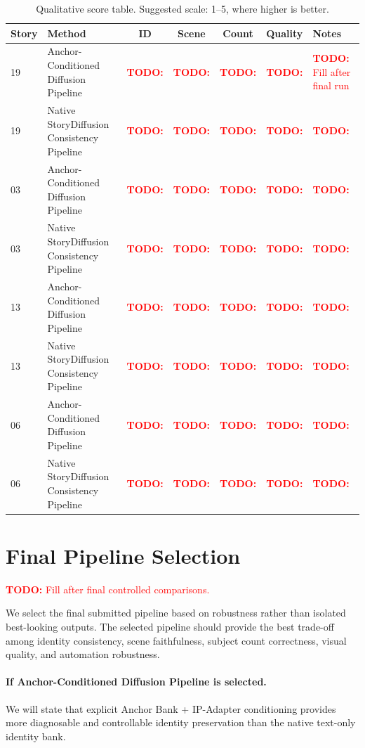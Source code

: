 \documentclass[11pt,a4paper]{article}
\newcommand{\todo}[1]{\textcolor{red}{\textbf{TODO:} #1}}
\newcommand{\pipelineA}{Anchor-Conditioned Diffusion Pipeline}
\newcommand{\pipelineB}{Native StoryDiffusion Consistency Pipeline}
\begin{document}
\begin{table}[H]
\centering
\small
\begin{tabularx}{\textwidth}{p{} p{} c c c c X}
\toprule
\textbf{Story} & \textbf{Method} & \textbf{ID} & \textbf{Scene} & \textbf{Count} & \textbf{Quality} & \textbf{Notes} \\
\midrule
19 & \pipelineA & \todo{} & \todo{} & \todo{} & \todo{} & \todo{Fill after final run} \\
19 & \pipelineB & \todo{} & \todo{} & \todo{} & \todo{} & \todo{} \\
03 & \pipelineA & \todo{} & \todo{} & \todo{} & \todo{} & \todo{} \\
03 & \pipelineB & \todo{} & \todo{} & \todo{} & \todo{} & \todo{} \\
13 & \pipelineA & \todo{} & \todo{} & \todo{} & \todo{} & \todo{} \\
13 & \pipelineB & \todo{} & \todo{} & \todo{} & \todo{} & \todo{} \\
06 & \pipelineA & \todo{} & \todo{} & \todo{} & \todo{} & \todo{} \\
06 & \pipelineB & \todo{} & \todo{} & \todo{} & \todo{} & \todo{} \\
\bottomrule
\end{tabularx}
\caption{Qualitative score table. Suggested scale: 1--5, where higher is better.}
\label{tab:results}
\end{table}

\section{Final Pipeline Selection}
\label{sec:final_selection}

\todo{Fill after final controlled comparisons.}

We select the final submitted pipeline based on robustness rather than isolated best-looking outputs. The selected pipeline should provide the best trade-off among identity consistency, scene faithfulness, subject count correctness, visual quality, and automation robustness.

\paragraph{If \pipelineA{} is selected.}
We will state that explicit Anchor Bank + IP-Adapter conditioning provides more diagnosable and controllable identity preservation than the native text-only identity bank.
\end{document}

